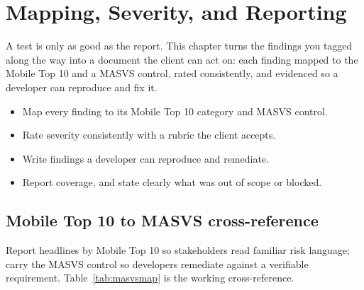 \chapter{Mapping, Severity, and Reporting}\label{ch:report}

A test is only as good as the report. This chapter turns the findings you tagged along the way into a document the client can act on: each finding mapped to the Mobile Top 10 and a MASVS control, rated consistently, and evidenced so a developer can reproduce and fix it.

\begin{objectives}
\begin{itemize}[leftmargin=12pt]
\item Map every finding to its Mobile Top 10 category and MASVS control.
\item Rate severity consistently with a rubric the client accepts.
\item Write findings a developer can reproduce and remediate.
\item Report coverage, and state clearly what was out of scope or blocked.
\end{itemize}
\end{objectives}

\section{Mobile Top 10 to MASVS cross-reference}
Report headlines by Mobile Top 10 so stakeholders read familiar risk language; carry the MASVS control so developers remediate against a verifiable requirement. Table~\ref{tab:masvsmap} is the working cross-reference.

